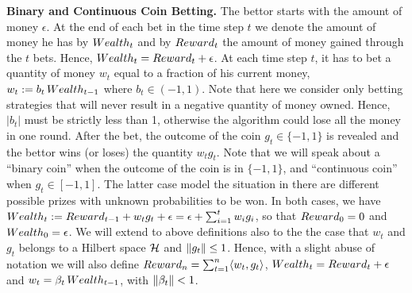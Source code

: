 \vspace{0.2cm}\noindent\textbf{Binary and Continuous Coin Betting.}
The bettor starts with the amount of money $\epsilon$. 
At the end of each bet in the time step $t$ we denote the amount of money he has by $Wealth_t$ and by $Reward_t$ the amount of money gained through the $t$ bets. Hence, $Wealth_t=Reward_t+\epsilon$.
At each time step $t$, it has to bet a quantity of money $w_t$ equal to a fraction of his current money, $w_t:=b_t \, Wealth_{t-1}$ where $b_t \in (-1,1)$. Note that here we consider only betting strategies that will never result in a negative quantity of money owned. Hence, $|b_t|$ must be strictly less than 1, otherwise the algorithm could lose all the money in one round.
After the bet, the outcome of the coin $g_t \in \{-1,1\}$ is revealed and the bettor wins (or loses) the quantity $w_t g_t$.
Note that we will speak about a ``binary coin'' when the outcome of the coin is in $\{-1,1\}$, and ``continuous coin'' when $g_t \in [-1,1]$. The latter case model the situation in there are different possible prizes with unknown probabilities to be won. In both cases, we have $Wealth_t:=Reward_{t-1} + w_t g_t + \epsilon= \epsilon + \sum_{i=1}^t w_i g_i$, so that $Reward_0=0$ and $Wealth_0=\epsilon$.
We will extend to above definitions also to the the case that $w_t$ and $g_t$ belongs to a Hilbert space $\mathcal{H}$ and $\left\|{g_t}\right\|\leq 1$. Hence, with a slight abuse of notation we will also define $Reward_n=\sum_{t=1}^n \langle w_t, g_t \rangle$, $Wealth_t=Reward_t + \epsilon$ and $w_t = \beta_t \, Wealth_{t-1}$, with $\left\|{\beta_t}\right\| < 1$.

